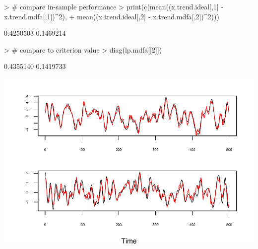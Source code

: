\documentclass[a4paper]{book}
\begin{document}
\begin{Schunk}
\begin{Sinput}
> # compare in-sample performance
> print(c(mean((x.trend.ideal[,1] - x.trend.mdfa[,1])^2),
+ 	mean((x.trend.ideal[,2] - x.trend.mdfa[,2])^2)))
\end{Sinput}
\begin{Soutput}
[1] 0.4250503 0.1469214
\end{Soutput}
\begin{Sinput}
> # compare to criterion value
> diag(lp.mdfa[[2]])
\end{Sinput}
\begin{Soutput}
[1] 0.4355140 0.1419733
\end{Soutput}
\end{Schunk}

\begin{Schunk}
\begin{Soutput}
\begin{figure}[htb!]
\end{Soutput}
\begin{Soutput}
\begin{center}
\end{Soutput}
\begin{Soutput}
\includegraphics[]{mdfa_var1_filtering.pdf}
\end{Soutput}
\begin{Soutput}
\caption{Ideal trends (black) for the bivariate VAR(1)
	with real-time MDFA trends (red) overlaid, for series one (upper panel)
	and series two (bottom panel).
\end{Soutput}
\begin{Soutput}
\label{fig:var1.trends}}
\end{Soutput}
\begin{Soutput}
\end{center}
\end{Soutput}
\begin{Soutput}
\end{figure}
\end{Soutput}
\end{Schunk}
\end{document}
